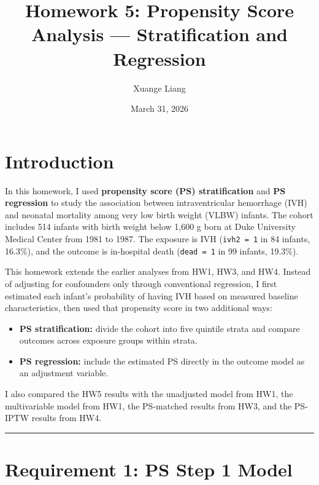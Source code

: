 \documentclass[
]{article}
\title{Homework 5: Propensity Score Analysis --- Stratification and
Regression}
\author{Xuange Liang}
\date{March 31, 2026}
\providecommand{\tightlist}{%
  \setlength{\itemsep}{0pt}\setlength{\parskip}{0pt}}
\let\oldtableofcontents\tableofcontents
\renewcommand{\tableofcontents}{%
    \oldtableofcontents
    \clearpage
  }
\begin{document}
\maketitle

{
\setcounter{tocdepth}{3}
\tableofcontents
}
\hypertarget{introduction}{%
\section{Introduction}\label{introduction}}

In this homework, I used \textbf{propensity score (PS) stratification}
and \textbf{PS regression} to study the association between
intraventricular hemorrhage (IVH) and neonatal mortality among very low
birth weight (VLBW) infants. The cohort includes 514 infants with birth
weight below 1,600 g born at Duke University Medical Center from 1981 to
1987. The exposure is IVH (\texttt{ivh2\ =\ 1} in 84 infants, 16.3\%),
and the outcome is in-hospital death (\texttt{dead\ =\ 1} in 99 infants,
19.3\%).

This homework extends the earlier analyses from HW1, HW3, and HW4.
Instead of adjusting for confounders only through conventional
regression, I first estimated each infant's probability of having IVH
based on measured baseline characteristics, then used that propensity
score in two additional ways:

\begin{itemize}
\tightlist
\item
  \textbf{PS stratification:} divide the cohort into five quintile
  strata and compare outcomes across exposure groups within strata.
\item
  \textbf{PS regression:} include the estimated PS directly in the
  outcome model as an adjustment variable.
\end{itemize}

I also compared the HW5 results with the unadjusted model from HW1, the
multivariable model from HW1, the PS-matched results from HW3, and the
PS-IPTW results from HW4.

\begin{center}\rule{0.5\linewidth}{0.5pt}\end{center}

\hypertarget{requirement-1-ps-step-1-model}{%
\section{Requirement 1: PS Step 1
Model}\label{requirement-1-ps-step-1-model}}
\end{document}
